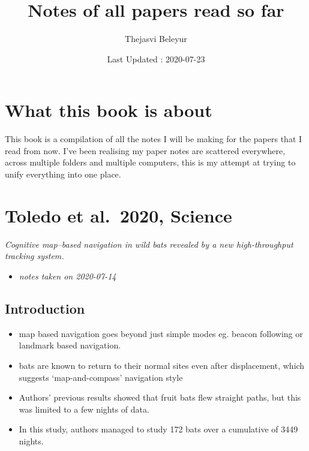 \documentclass[
]{book}
\title{Notes of all papers read so far}
\author{Thejasvi Beleyur}
\date{Last Updated : 2020-07-23}
\providecommand{\tightlist}{%
  \setlength{\itemsep}{0pt}\setlength{\parskip}{0pt}}
\begin{document}
\maketitle

{
\setcounter{tocdepth}{1}
\tableofcontents
}
\hypertarget{what-this-book-is-about}{%
\chapter*{What this book is about}\label{what-this-book-is-about}}

This book is a compilation of all the notes I will be making for the papers that I read from now.
I've been realising my paper notes are scattered everywhere, across multiple folders and multiple computers,
this is my attempt at trying to unify everything into one place.

\hypertarget{toledo-et-al.-2020-science}{%
\chapter{Toledo et al.~2020, Science}\label{toledo-et-al.-2020-science}}


\emph{Cognitive map--based navigation in wild bats revealed by a new high-throughput tracking system.} \citep{toledo2020cognitive}

\begin{itemize}
\tightlist
\item
  \emph{notes taken on 2020-07-14}
\end{itemize}

\hypertarget{introduction}{%
\section{Introduction}\label{introduction}}

\begin{itemize}
\tightlist
\item
  map based navigation goes beyond just simple modes eg. beacon following or landmark based navigation.
\item
  bats are known to return to their normal sites even after displacement, which suggests `map-and-compass' navigation style
\item
  Authors' previous results showed that fruit bats flew straight paths, but this was limited to a few nights of data.
\item
  In this study, authors managed to study 172 bats over a cumulative of 3449 nights.
\end{itemize}
\end{document}
